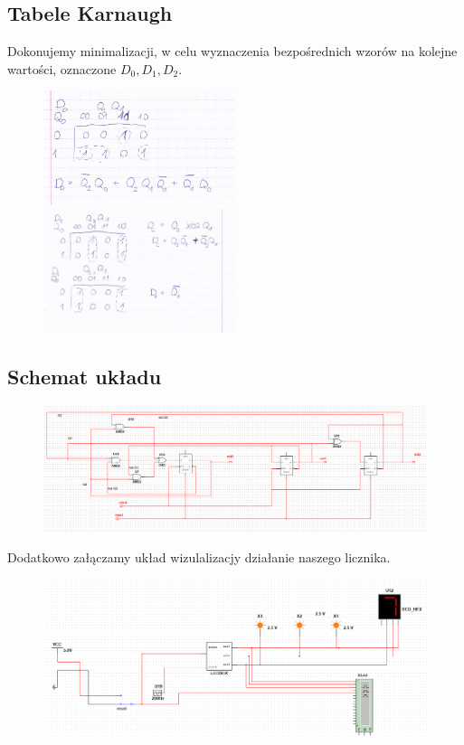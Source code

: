 \documentclass{article}
\begin{document}
\subsection{Tabele Karnaugh}
Dokonujemy minimalizacji, w celu wyznaczenia bezpośrednich wzorów na kolejne wartości, oznaczone $D_{0}, D_{1},D_{2}$.
\begin{figure}[H]
\includegraphics[width = 0.5\textwidth]{3a_karnaugh_2}
\includegraphics[width = 0.5\textwidth]{3a_karnaugh_1}
\end{figure}
\subsection{Schemat układu}
\begin{figure}[H]
\includegraphics[width = \textwidth]{3a_uklad}
\end{figure}
Dodatkowo załączamy układ wizulalizacjy działanie naszego licznika.
\begin{figure}[H]
\includegraphics[width = \textwidth]{3a_wizualizacja}
\end{figure}
\end{document}
